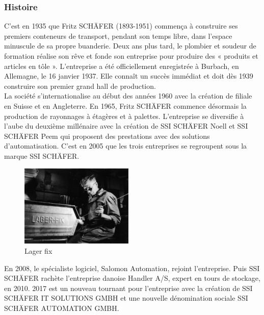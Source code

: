 \documentclass[a4paper, 12pt, french]{article}
\begin{document}
			\subsubsection{Histoire}
				C'est en 1935 que Fritz SCHÄFER (1893-1951) commença à construire ses premiers conteneurs de transport, pendant son temps libre, dans l'espace minuscule de sa propre buanderie. Deux ans plus tard, le plombier et soudeur de formation réalise son rêve et fonde son entreprise pour produire des « produits et articles en tôle ». L'entreprise a été officiellement enregistrée à Burbach, en Allemagne, le 16 janvier 1937. Elle connaît un succès immédiat et doit dès 1939 construire son premier grand hall de production.\\

				La société s'internationalise au début des années 1960 avec la création de filiale en Suisse et en Angleterre. En 1965, Fritz SCHÄFER commence désormais la production de rayonnages à étagères et à palettes. L'entreprise se diversifie à l'aube du deuxième millénaire avec la création de SSI SCHÄFER Noell et SSI SCHÄFER Peem qui proposent des prestations avec des solutions d'automatisation. C'est en 2005 que les trois entreprises se regroupent sous la marque SSI SCHÄFER.\\

				\begin{figure}
					\label{fig:lager}
					\vspace{-20pt}
					\begin{center}
						\includegraphics[width=0.48\textwidth]{images/lager_fix.jpg}
					\end{center}
					\vspace{-20pt}
					\caption{Lager fix}
					\vspace{-10pt}
				\end{figure}

				En 2008, le spécialiste logiciel, Salomon Automation, rejoint l'entreprise. Puis SSI SCHÄFER rachète l'entreprise danoise Handler A/S, expert en tours de stockage, en 2010. 2017 est un nouveau tournant pour l'entreprise avec la création de SSI SCHÄFER IT SOLUTIONS GMBH et une nouvelle dénomination sociale SSI SCHÄFER AUTOMATION GMBH.\\
			
\end{document}
